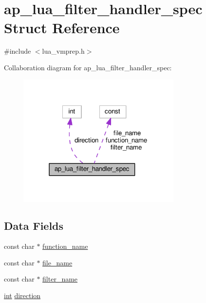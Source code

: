 \hypertarget{structap__lua__filter__handler__spec}{}\section{ap\+\_\+lua\+\_\+filter\+\_\+handler\+\_\+spec Struct Reference}
\label{structap__lua__filter__handler__spec}


{\ttfamily \#include $<$lua\+\_\+vmprep.\+h$>$}



Collaboration diagram for ap\+\_\+lua\+\_\+filter\+\_\+handler\+\_\+spec\+:
\nopagebreak
\begin{figure}[H]
\begin{center}
\leavevmode
\includegraphics[width=231pt]{structap__lua__filter__handler__spec__coll__graph}
\end{center}
\end{figure}
\subsection*{Data Fields}
\begin{DoxyCompactItemize}
\item 
const char $\ast$ \hyperlink{structap__lua__filter__handler__spec_a3257a246db41b9c853054fd50876ee3b}{function\+\_\+name}
\item 
const char $\ast$ \hyperlink{structap__lua__filter__handler__spec_a7f07bc8edc962ad5cdbb9ff4f30dc72a}{file\+\_\+name}
\item 
const char $\ast$ \hyperlink{structap__lua__filter__handler__spec_ad0136f36f7170df6a978d2a43c1f9858}{filter\+\_\+name}
\item 
\hyperlink{pcre_8txt_a42dfa4ff673c82d8efe7144098fbc198}{int} \hyperlink{structap__lua__filter__handler__spec_a408a17a71e78844af0f443c042ca191f}{direction}
\end{DoxyCompactItemize}


